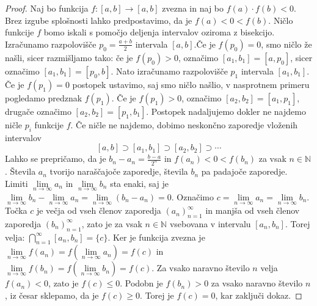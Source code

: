 \documentclass[mat2]{fmfdelo}
\newcommand{\N}{\mathbb N}
\begin{document}
\begin{proof}
Naj bo funkcija $f:[a, b] \to [a, b]$ zvezna in naj bo $f(a)\cdot f(b) < 0$. Brez izgube splošnosti lahko predpostavimo, da je $f(a) < 0 < f(b)$. Ničlo funkcije $f$ bomo iskali s pomočjo deljenja intervalov oziroma z bisekcijo. Izračunamo razpolovišče $p_0=\frac{a+b}{2}$ intervala $[a, b]$.Če je $f(p_0)=0$, smo ničlo že našli, sicer razmišljamo tako: če je $f(p_0) >0$, označimo $[a_1, b_1] =  [a, p_0]$, sicer označimo $[a_1, b_1] =  [p_0, b]$. Nato izračunamo razpolovišče $p_1$ intervala $[a_1, b_1]$. Če je $f(p_1)=0$ postopek ustavimo, saj smo ničlo našlio, v nasprotnem primeru pogledamo predznak $f(p_1)$. Če je $f(p_1) >0$, označimo $[a_2, b_2] =  [a_1, p_1]$, drugače označimo $[a_2, b_2] =  [p_1, b_1]$. Postopek nadaljujemo dokler ne najdemo ničle $p_i$ funkcije $f$. Če ničle ne najdemo, dobimo neskončno zaporedje vloženih intervalov 
$$ [a, b] \supset [a_1, b_1] \supset [a_2, b_2] \supset \cdots$$
Lahko se prepričamo, da je $b_n - a_n = \frac{b-a}{2^n}$ in $f(a_n)<0<f(b_n)$ za vsak $n\in \N$. Števila $a_n$ tvorijo naraščajoče zaporedje, števila $b_n$ pa padajoče zaporedje.  Limiti $\lim\limits_{n \to \infty} a_n$ in $\lim\limits_{n \to \infty} b_n$ sta enaki, saj je 
$\lim\limits_{n \to \infty} b_n - \lim\limits_{n \to \infty} a_n = \lim\limits_{n \to \infty} (b_n - a_n) =0$. Označimo $c = \lim\limits_{n \to \infty} a_n = \lim\limits_{n \to \infty} b_n$. Točka $c$ je večja od vseh členov zaporedja $\left(a_n \right)_{n=1}^{\infty}$ in manjša od vseh členov zaporedja $\left(b_n \right)_{n=1}^{\infty}$, zato je za vsak $n \in \N$ vsebovana v intervalu $[a_n, b_n]$. Torej velja:
$\bigcap\limits_{n=1}^{\infty} [a_n, b_n] = \{c\}$. 
Ker je funkcija zvezna je 
$\lim\limits_{n \to \infty} f(a_n) = f(\lim\limits_{n \to \infty} a_n) = f(c)$
in 
$\lim\limits_{n \to \infty} f(b_n) = f(\lim\limits_{n \to \infty} b_n) = f(c)$.
Za vsako naravno število $n$ velja $f(a_n) <0$, zato je $f(c) \leq 0$. Podobn je $f(b_n) > 0$ za vsako naravno število $n$, iz česar sklepamo, da je $f(c) \geq 0$. Torej je $f(c) = 0$, kar zaključi dokaz.
\end{proof}
\end{document}
